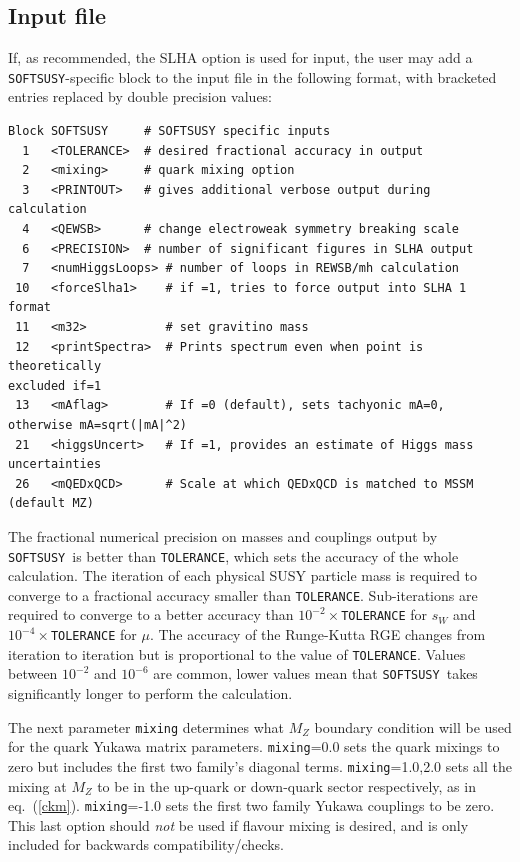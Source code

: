 \documentclass{article}
\def\SOFTSUSY{{\tt SOFTSUSY}}
\def\code#1{\small{\tt #1}\normalsize}
\begin{document}
\subsection{Input file \label{sec:input}}

If, as recommended, the SLHA option is used for input, the user may
add
a \SOFTSUSY-specific block to the input file in the following format, with
bracketed entries replaced by double precision values:
\small
\begin{verbatim}
Block SOFTSUSY     # SOFTSUSY specific inputs
  1   <TOLERANCE>  # desired fractional accuracy in output
  2   <mixing>     # quark mixing option
  3   <PRINTOUT>   # gives additional verbose output during calculation
  4   <QEWSB>      # change electroweak symmetry breaking scale
  6   <PRECISION>  # number of significant figures in SLHA output
  7   <numHiggsLoops> # number of loops in REWSB/mh calculation
 10   <forceSlha1>    # if =1, tries to force output into SLHA 1 format
 11   <m32>           # set gravitino mass
 12   <printSpectra>  # Prints spectrum even when point is theoretically
excluded if=1
 13   <mAflag>        # If =0 (default), sets tachyonic mA=0, otherwise mA=sqrt(|mA|^2)
 21   <higgsUncert>   # If =1, provides an estimate of Higgs mass uncertainties
 26   <mQEDxQCD>      # Scale at which QEDxQCD is matched to MSSM (default MZ)
\end{verbatim}
\normalsize
The fractional numerical precision on masses and couplings output by \SOFTSUSY~is better than \code{TOLERANCE}, which
sets the accuracy of the whole calculation. The iteration of
each physical SUSY particle mass is required to converge to a
fractional accuracy smaller than \code{TOLERANCE}. Sub-iterations are required
to converge to a better accuracy than $10^{-2}\times$\code{TOLERANCE} for
$s_W$ and 
$10^{-4}\times$\code{TOLERANCE} for $\mu$. The accuracy of the Runge-Kutta RGE
changes from iteration to iteration but is proportional to the value of 
\code{TOLERANCE}. Values between $10^{-2}$ and $10^{-6}$ are common, lower
values  
mean that \SOFTSUSY~takes significantly longer to perform the calculation.

The next parameter
\code{mixing} determines what $M_Z$ boundary condition will be used for the
quark Yukawa matrix parameters.
\code{mixing}=0.0 sets the quark mixings to zero but includes the first two 
family's diagonal terms.
\code{mixing}=1.0,2.0 sets all the mixing at $M_Z$
to be in the up-quark or down-quark
sector respectively, as in eq.~(\ref{ckm}).
\code{mixing}=-1.0 sets the first two family Yukawa couplings to be zero. This
last option should {\em not}\/ be used if flavour mixing is desired, and is
only included for backwards compatibility/checks.
\end{document}
